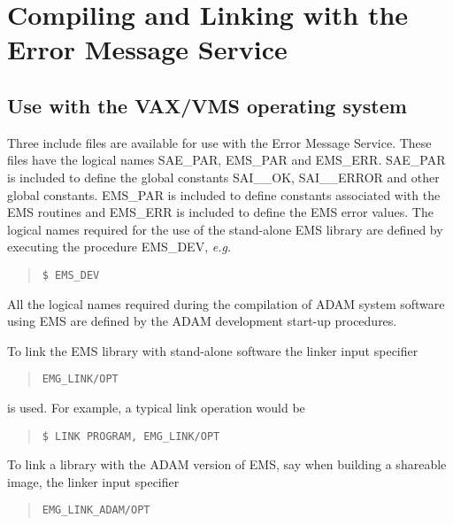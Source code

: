 \section {Compiling and Linking with the Error Message Service}

\subsection {Use with the VAX/VMS operating system}


Three include files are available for use with the Error Message Service.
These files have the logical names SAE\_PAR, EMS\_PAR and EMS\_ERR.
SAE\_PAR is included to define the global constants SAI\_\_OK, SAI\_\_ERROR 
and other global constants.
EMS\_PAR is included to define constants associated with the EMS routines and
EMS\_ERR is included to define the EMS error values.
The logical names required for the use of the stand-alone EMS library are
defined by executing the procedure EMS\_DEV, {\em e.g.}

\begin {quote}
\begin{verbatim}
$ EMS_DEV
\end{verbatim}
\end {quote}

All the logical names required during the compilation of ADAM system software
using EMS are defined by the ADAM development start-up procedures.

To link the EMS library with stand-alone software the linker input specifier

\begin {quote}
\begin{verbatim}
EMG_LINK/OPT
\end{verbatim}
\end {quote}

is used. 
For example, a typical link operation would be

\begin {quote}
\begin{verbatim}
$ LINK PROGRAM, EMG_LINK/OPT
\end{verbatim}
\end {quote}
To link a library with the ADAM version of EMS, say when building a shareable
image, the linker input specifier 

\begin {quote}
\begin{verbatim}
EMG_LINK_ADAM/OPT
\end{verbatim}
\end {quote}

